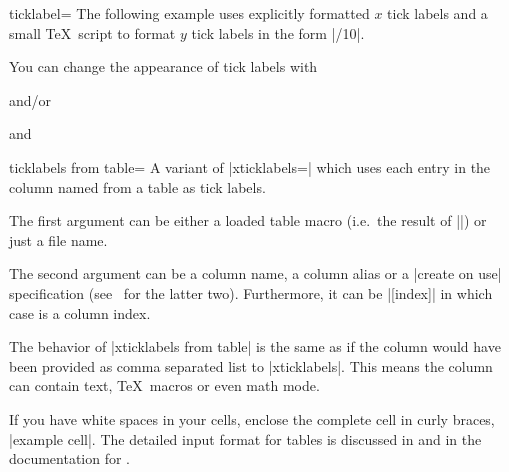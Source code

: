 \begin{pgfplotsxykey}{\x ticklabel=}
The following example uses explicitly formatted $x$ tick labels and a small \TeX\ script to format $y$ tick labels in the form |/10|.
\begin{codeexample}[width=4cm]
\end{codeexample}

You can change the appearance of tick labels with
\begin{codeexample}
\end{codeexample}
and/or
\begin{codeexample}
\end{codeexample}
and
\begin{codeexample}
\end{codeexample}
\end{pgfplotsxykey}

\begin{pgfplotsxykey}{\x ticklabels from table=}
	A variant of |xticklabels=| which uses each entry in the column named  from a table as tick labels.

	The first argument  can be either a loaded table macro (i.e.\ the result of |\pgfplotstableread|) or just a file name.

	The second argument can be a column name, a column alias or a |create on use| specification (see \PGFPlotstable\ for the latter two). Furthermore, it can be |[index]| in which case  is a column index.

	The behavior of |xticklabels from table| is the same as if the column  would have been provided as comma separated list to |xticklabels|. This means the column can contain text, \TeX\ macros or even math mode.

	If you have white spaces in your cells, enclose the complete cell in curly braces, |{example cell}|. The detailed input format for tables is discussed in  and in the documentation for \PGFPlotstable.
\end{pgfplotsxykey}

